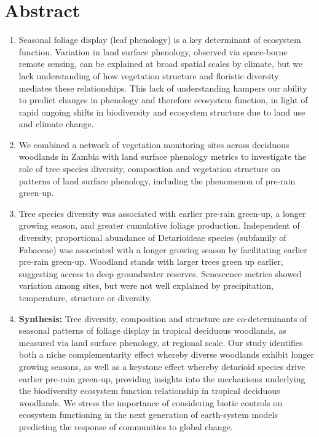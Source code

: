 \documentclass[11pt,a4paper]{article}
\begin{document}
\section*{Abstract}

\begin{enumerate}
	\item{Seasonal foliage display (leaf phenology) is a key determinant of
		ecosystem function. Variation in land surface phenology, observed
		via space-borne remote sensing, can be explained at broad spatial
		scales by climate, but we lack understanding of how vegetation
		structure and floristic diversity mediates these relationships.
		This lack of understanding hampers our ability to predict changes in phenology and
		therefore ecosystem function, in light of rapid ongoing shifts in
		biodiversity and ecosystem structure due to land use and climate
		change.}
		
	\item{We combined a network of \nSites{} vegetation monitoring sites
		across deciduous woodlands in Zambia with land surface phenology
		metrics to investigate the role of tree species diversity, composition and
		vegetation structure on patterns of land surface phenology, including the
		phenomenon of pre-rain green-up.} 

	\item{Tree species diversity was associated with earlier pre-rain green-up,
		a longer growing season, and greater cumulative foliage production. Independent of diversity,
		proportional abundance of Detarioideae species (subfamily of Fabaceae)
		was associated with a longer growing season by
		facilitating earlier pre-rain green-up. Woodland stands with larger
		trees green up earlier, suggesting access to deep groundwater reserves. Senescence
		metrics showed variation among sites, but were not well
		explained by precipitation, temperature, structure or diversity.}

	\item{\textbf{Synthesis:} Tree diversity, composition and structure are co-determinants
		of seasonal patterns of foliage display in tropical deciduous
		woodlands, as measured via land surface phenology, at regional scale. Our study
		identifies both a niche complementarity effect whereby diverse woodlands
		exhibit longer growing seasons, as well as a keystone effect whereby detarioid
		species drive earlier pre-rain green-up, providing insights into the mechanisms
		underlying the biodiversity ecosystem function relationship in tropical
		deciduous woodlands. We stress the importance of considering biotic
		controls on ecosystem functioning in the next generation of earth-system
		models predicting the response of communities to global change.}

\end{enumerate}
\end{document}
